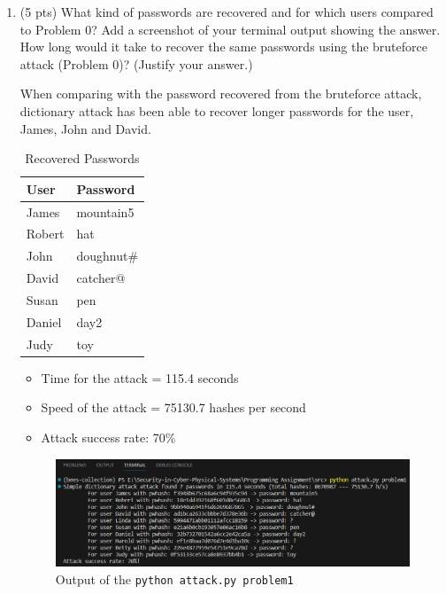 \documentclass[11pt,letterpaper]{article}
\newenvironment{answer}{\em \color{blue} \begin{adjustwidth}{1cm}{1cm}}{\end{adjustwidth}}
\begin{document}
\begin{enumerate}
\begin{answer}
		\end{answer}
		
		\item (5 pts) What kind of passwords are recovered and for which users compared to Problem 0? Add a screenshot of your terminal output showing the answer. How long would it take to recover the same passwords using the bruteforce attack (Problem 0)? (Justify your answer.)
		
		\begin{answer}
			
			When comparing with the password recovered from the bruteforce attack, dictionary attack has been able to recover longer passwords for the user, James, John and David.
			
			\begin{table}[h]
				\centering
				\begin{tabular}{|l|l|}
					\hline
					\textbf{User} & \textbf{Password} \\ \hline
					James & mountain5 \\ \hline
					Robert & hat \\ \hline
					John & doughnut\# \\ \hline
					David & catcher@ \\ \hline
					Susan & pen \\ \hline
					Daniel & day2 \\ \hline
					Judy & toy \\ \hline
				\end{tabular}
				\caption{Recovered Passwords}
			\end{table}
		\begin{itemize}
			\item Time for the attack = 115.4 seconds
			\item Speed of the attack = 75130.7 hashes per second
			\item Attack success rate: 70\%
		\end{itemize}
			
				\begin{figure}[h]
				\centering
				\includegraphics[width=0.7\columnwidth]{images/p1/q21.png}
				\caption{Output of the {\tt python attack.py problem1}}
			\end{figure}
			

\end{answer}
\end{enumerate}
\end{document}
